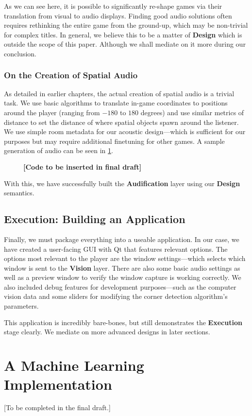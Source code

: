 \documentclass{report}
\newcommand{\design}{\textbf{Design}\xspace}
\newcommand{\exec}{\textbf{Execution}\xspace}
\newcommand{\vision}{\textbf{Vision}\xspace}
\newcommand{\audio}{\textbf{Audification}\xspace}
\begin{document}
As we can see here, it is possible to significantly re-shape games via their translation from visual to audio displays. Finding good audio solutions often requires rethinking the entire game from the ground-up, which may be non-trivial for complex titles. In general, we believe this to be a matter of \design which is outside the scope of this paper. Although we shall mediate on it more during our conclusion.

\subsubsection{On the Creation of Spatial Audio}
As detailed in earlier chapters, the actual creation of spatial audio is a trivial task. We use basic algorithms to translate in-game coordinates to positions around the player (ranging from $-180$ to $180$ degrees) and use similar metrics of distance to set the distance of where spatial objects spawn around the listener. We use simple room metadata for our acoustic design---which is sufficient for our purposes but may require additional finetuning for other games. A sample generation of audio can be seen in \ref{code:audio}. 

\begin{figure}
    \label{code:audio}
    \caption{\textbf{[Code to be inserted in final draft]}}
\end{figure}

With this, we have successfully built the \audio layer using our \design semantics. 

\subsection{Execution: Building an Application}
Finally, we must package everything into a useable application. In our case, we have created a user-facing GUI with Qt that features relevant options. The options most relevant to the player are the window settings---which selects which window is sent to the \vision layer. There are also some basic audio settings as well as a preview window to verify the window capture is working correctly. We also included debug features for development purposes---such as the computer vision data and some sliders for modifying the corner detection algorithm's parameters.

This application is incredibly bare-bones, but still demonstrates the \exec stage clearly. We mediate on more advanced designs in later sections.

\section{A Machine Learning Implementation}
[To be completed in the final draft.]
\end{document}
